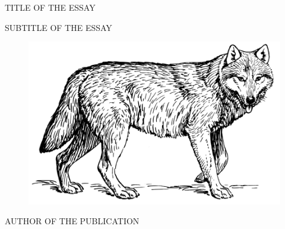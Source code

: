 \begin{titlepage}

  \begin{center}


    {
      \fontsize{60pt}{70pt}\selectfont
      \textcolor{titlecolor}
      {TITLE OF THE ESSAY}\\[2cm]
    }

    \textsc{\huge
      SUBTITLE OF THE ESSAY
    }\\[4cm]

    \begin{figure}[h]
      \centering
      \includegraphics[width=12cm]{logo.png}
    \end{figure}

    \vspace{1.5cm}

    \textsc{\Large
      AUTHOR OF THE PUBLICATION
    }

  \end{center}
\end{titlepage}

